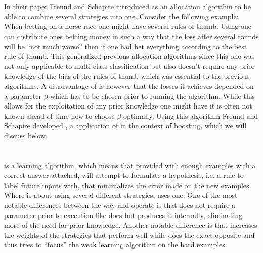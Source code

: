 \section{\hedge}
In their paper Freund and Schapire introduced \hedge as an allocation algorithm to be able to combine several strategies into one. Consider the following example: When betting on a horse race one might have several rules of thumb. Using \hedge one can distribute ones betting money in such a way that the loss after several rounds will be ``not much worse'' then if one had bet everything according to the best rule of thumb. This generalized previous allocation algorithms since this one was not only applicable to multi class classification but also doesn't require any prior knowledge of the bias of the rules of thumb which was essential to the previous algorithms. A disadvantage of \hedge is however that the losses it achieves depended on a parameter $\beta$ which has to be chosen prior to running the algorithm. While this allows for the exploitation of any prior knowledge one might have it is often not known ahead of time how to choose $\beta$ optimally. Using this \hedge algorithm Freund and Schapire developed \adaB, a application of \hedge in the context of boosting, which we will discuss below. 

\section{\adaB}
\adaB is a learning algorithm, which means that provided with enough examples with a correct answer attached, \adaB will attempt to formulate a hypothesis, i.e. a rule to label future inputs with, that minimalizes the error made on the new examples. Where \hedge is about using several different strategies, \adaB uses one. One of the most notable differences between the way \hedge and \adaB operate is that \adaB does not require a parameter prior to execution like \hedge does but produces it internally, eliminating more of the need for prior knowledge. Another notable difference is that \hedge increases the weights of the strategies that perform well while \adaB does the exact opposite and thus tries to ``focus'' the weak learning algorithm on the hard examples. 
